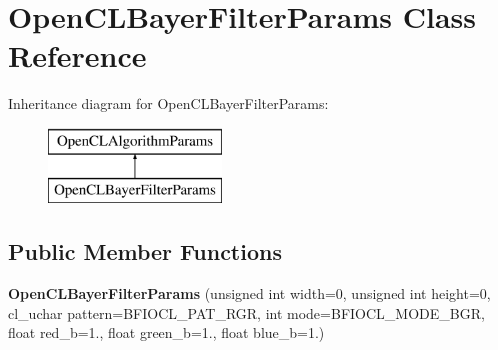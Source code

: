 \hypertarget{class_open_c_l_bayer_filter_params}{\section{Open\-C\-L\-Bayer\-Filter\-Params Class Reference}
\label{class_open_c_l_bayer_filter_params}
}
Inheritance diagram for Open\-C\-L\-Bayer\-Filter\-Params\-:\begin{figure}[H]
\begin{center}
\leavevmode
\includegraphics[height=2.000000cm]{class_open_c_l_bayer_filter_params}
\end{center}
\end{figure}
\subsection*{Public Member Functions}
\begin{DoxyCompactItemize}
\item 
\hypertarget{class_open_c_l_bayer_filter_params_ada7e320b222fb2642b7473fb01704072}{{\bfseries Open\-C\-L\-Bayer\-Filter\-Params} (unsigned int width=0, unsigned int height=0, cl\-\_\-uchar pattern=B\-F\-I\-O\-C\-L\-\_\-\-P\-A\-T\-\_\-\-R\-G\-R, int mode=B\-F\-I\-O\-C\-L\-\_\-\-M\-O\-D\-E\-\_\-\-B\-G\-R, float red\-\_\-b=1., float green\-\_\-b=1., float blue\-\_\-b=1.)}\label{class_open_c_l_bayer_filter_params_ada7e320b222fb2642b7473fb01704072}

\end{DoxyCompactItemize}

